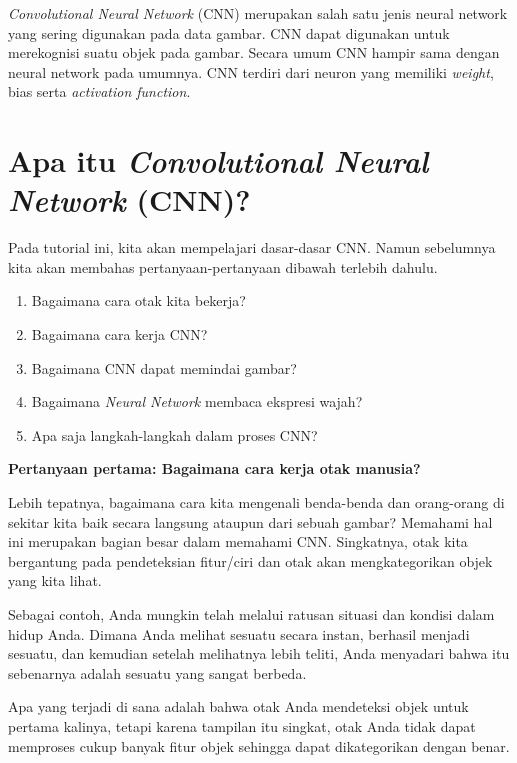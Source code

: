\textit{Convolutional Neural Network} (CNN) merupakan salah satu jenis neural network yang sering digunakan pada data gambar. CNN dapat digunakan untuk merekognisi suatu objek pada gambar.
Secara umum CNN hampir sama dengan neural network pada umumnya. CNN terdiri dari neuron yang memiliki \textit{weight}, bias serta \textit{activation function}.

\section{Apa itu \textit{Convolutional Neural Network} (CNN)?}
Pada tutorial ini, kita akan mempelajari dasar-dasar CNN. Namun sebelumnya kita akan membahas pertanyaan-pertanyaan dibawah terlebih dahulu.
\begin{enumerate}
	\item Bagaimana cara otak kita bekerja?
	\item Bagaimana cara kerja CNN?
	\item Bagaimana CNN dapat memindai gambar?
	\item Bagaimana \textit{Neural Network} membaca ekspresi wajah?
	\item Apa saja langkah-langkah dalam proses CNN?
\end{enumerate}

\textbf{Pertanyaan pertama: Bagaimana cara kerja otak manusia?}

Lebih tepatnya, bagaimana cara kita mengenali benda-benda dan orang-orang di sekitar kita baik secara langsung ataupun dari sebuah gambar? Memahami hal ini merupakan bagian besar dalam memahami CNN. Singkatnya, otak kita bergantung pada pendeteksian fitur/ciri dan otak akan mengkategorikan objek yang kita lihat.

Sebagai contoh, Anda mungkin telah melalui ratusan situasi dan kondisi dalam hidup Anda. Dimana Anda melihat sesuatu secara instan, berhasil menjadi sesuatu, dan kemudian setelah melihatnya lebih teliti, Anda menyadari bahwa itu sebenarnya adalah sesuatu yang sangat berbeda.

Apa yang terjadi di sana adalah bahwa otak Anda mendeteksi objek untuk pertama kalinya, tetapi karena tampilan itu singkat, otak Anda tidak dapat memproses cukup banyak fitur objek sehingga dapat dikategorikan dengan benar.
